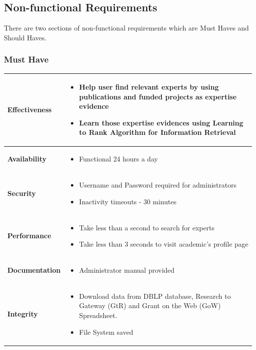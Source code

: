 \subsection{Non-functional Requirements}
There are two sections of non-functional requirements which are Must Haves and Should Haves.

\subsubsection{Must Have}

\begin{tabular}{|l|p{8.5cm}|}
\hline \textbf{Effectiveness} & 
\begin{itemize}
 \item Help user find relevant experts by using publications and funded projects as expertise evidence
 \item Learn those expertise evidences using Learning to Rank Algorithm for Information Retrieval
\end{itemize} \\
\hline \textbf{Availability} & 
\begin{itemize}
 \item Functional 24 hours a day
\end{itemize} \\
\hline \textbf{Security} & 
\begin{itemize}
 \item Username and Password required for administrators
 \item Inactivity timeouts - 30 minutes
\end{itemize} \\
\hline \textbf{Performance} & 
\begin{itemize}
 \item Take less than a second to search for experts
 \item Take less than 3 seconds to visit academic's profile page
\end{itemize} \\ 
\hline \textbf{Documentation} & 
\begin{itemize}
 \item Administrator manual provided
\end{itemize} \\ 
\hline \textbf{Integrity} & 
\begin{itemize}
 \item Download data from DBLP database, Research to Gateway (GtR) and Grant on the Web (GoW) Spreadsheet.
 \item File System saved
\end{itemize} \\ 
\hline
\end{tabular}

